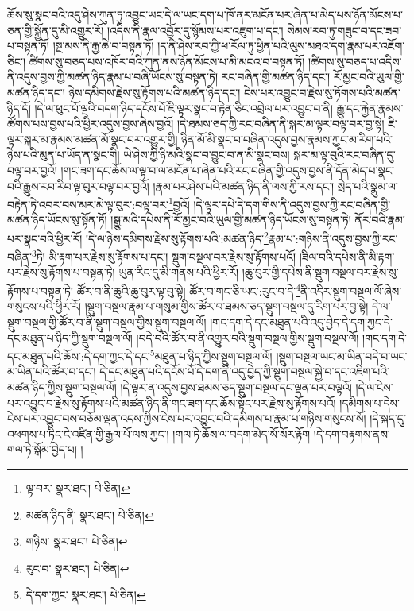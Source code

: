 ཆོས་སུ་སྣང་བའི་འདུ་ཤེས་ཀུན་ཏུ་འབྱུང་ཡང་དེ་ལ་ཡང་དག་པ་ཁོ་ནར་མངོན་པར་ཞེན་པ་མེད་པས་ཉོན་མོངས་པ་ཅན་གྱི་སྐྱོན་དུ་མི་འགྱུར་རོ། །འདིས་ནི་རྣལ་འབྱོར་དུ་སྙོམས་པར་འཇུག་པ་དང་། སེམས་རབ་ཏུ་གཟུང་བ་དང་ཟབ་པ་བསྟན་ཏོ། །སྔ་མས་ནི་རྒྱ་ཆེ་བ་བསྟན་ཏོ། །ད་ནི་ཤེས་རབ་ཀྱི་ཕ་རོལ་ཏུ་ཕྱིན་པའི་ལུས་མཐའ་དག་རྣམ་པར་འཇོག་ཅིང་། ཚིགས་སུ་བཅད་པས་འཁོར་བའི་ཀུན་ནས་ཉོན་མོངས་པ་མི་མངའ་བ་བསྟན་ཏོ། །ཚིགས་སུ་བཅད་པ་འདིས་ནི་འདུས་བྱས་ཀྱི་མཚན་ཉིད་རྣམ་པ་བཞི་ཡོངས་སུ་བསྟན་ཏེ། རང་བཞིན་གྱི་མཚན་ཉིད་དང་། རོ་མྱང་བའི་ཡུལ་གྱི་མཚན་ཉིད་དང་། ཉེས་དམིགས་རྗེས་སུ་རྟོགས་པའི་མཚན་ཉིད་དང་། ངེས་པར་འབྱུང་བ་རྗེས་སུ་ཏོགས་པའི་མཚན་ཉིད་དོ། །དེ་ལ་ཕུང་པོ་ལྔའི་བདག་ཉིད་དངོས་པོ་ཇི་ལྟར་སྣང་བ་རྟེན་ཅིང་འབྲེལ་པར་འབྱུང་བ་ནི། རྒྱུ་དང་རྐྱེན་རྣམས་ཚོགས་པས་བྱས་པའི་ཕྱིར་འདུས་བྱས་ཞེས་བྱའོ། །དེ་ཐམས་ཅད་ཀྱི་རང་བཞིན་ནི་སྐར་མ་ལྟར་བལྟ་བར་བྱ་སྟེ། ཇི་ལྟར་སྐར་མ་རྣམས་མཚན་མོ་སྣང་བར་འགྱུར་གྱི། ཉིན་མོ་མི་སྣང་བ་བཞིན་འདུས་བྱས་རྣམས་ཀྱང་མ་རིག་པའི་ཉེས་པའི་མུན་པ་ཡོད་ན་སྣང་གི། ཡེ་ཤེས་ཀྱི་ཉི་མའི་སྣང་བ་བྱུང་བ་ན་མི་སྣང་བས། སྐར་མ་ལྟ་བུའི་རང་བཞིན་དུ་བལྟ་བར་བྱའོ། །གང་ཟག་དང་ཆོས་ལ་ལྟ་བ་ལ་མངོན་པ་ཞེན་པའི་རང་བཞིན་གྱི་འདུས་བྱས་ནི་དོན་མེད་པ་སྣང་བའི་རྒྱུས་རབ་རིབ་ལྟ་བུར་བལྟ་བར་བྱའོ། །རྣམ་པར་ཤེས་པའི་མཚན་ཉིད་ནི་ལས་ཀྱི་རས་དང་། སྲེད་པའི་སྣུམ་ལ་བརྟེན་ཏེ་འབར་བས་མར་མེ་ལྟ་བུར་:བལྟ་བར་\footnote{ལྟ་བར་  སྣར་ཐང་།  པེ་ཅིན། }བྱའོ། །དེ་ལྟར་དཔེ་དེ་དག་གིས་ནི་འདུས་བྱས་ཀྱི་རང་བཞིན་གྱི་མཚན་ཉིད་ཡོངས་སུ་སྟོན་ཏོ། །སྒྱུ་མའི་དཔེས་ནི་རོ་མྱང་བའི་ཡུལ་གྱི་མཚན་ཉིད་ཡོངས་སུ་བསྟན་ཏེ། ནོར་བའི་རྣམ་པར་སྣང་བའི་ཕྱིར་རོ། །དེ་ལ་ཉེས་དམིགས་རྗེས་སུ་རྟོགས་པའི་:མཚན་ཉིད་\footnote{མཚན་ཉིད་ནི་  སྣར་ཐང་།  པེ་ཅིན། }རྣམ་པ་:གཉིས་ནི་འདུས་བྱས་ཀྱི་རང་བཞིན་\footnote{གཉིས་  སྣར་ཐང་།  པེ་ཅིན། }ཏེ། མི་རྟག་པར་རྗེས་སུ་རྟོགས་པ་དང་། སྡུག་བསྔལ་བར་རྗེས་སུ་རྟོགས་པའོ། །ཟིལ་བའི་དཔེས་ནི་མི་རྟག་པར་རྗེས་སུ་རྟོགས་པ་བསྟན་ཏེ། ཡུན་རིང་དུ་མི་གནས་པའི་ཕྱིར་རོ། །ཆུ་བུར་གྱི་དཔེས་ནི་སྡུག་བསྔལ་བར་རྗེས་སུ་རྟོགས་པ་བསྟན་ཏེ། ཚོར་བ་ནི་ཆུའི་ཆུ་བུར་ལྟ་བུ་སྟེ། ཚོར་བ་གང་ཅི་ཡང་:རུང་བ་དེ་\footnote{རུང་བ་  སྣར་ཐང་།  པེ་ཅིན། }ནི་འདིར་སྡུག་བསྔལ་ལོ་ཞེས་གསུངས་པའི་ཕྱིར་རོ། །སྡུག་བསྔལ་རྣམ་པ་གསུམ་གྱིས་ཚོར་བ་ཐམས་ཅད་སྡུག་བསྔལ་དུ་རིག་པར་བྱ་སྟེ། དེ་ལ་སྡུག་བསྔལ་གྱི་ཚོར་བ་ནི་སྡུག་བསྔལ་གྱིས་སྡུག་བསྔལ་ལོ། །གང་དག་དེ་དང་མཐུན་པའི་འདུ་བྱེད་དེ་དག་ཀྱང་དེ་དང་མཐུན་པ་ཉིད་ཀྱི་སྡུག་བསྔལ་ལོ། །བདེ་བའི་ཚོར་བ་ནི་འགྱུར་བའི་སྡུག་བསྔལ་གྱིས་སྡུག་བསྔལ་ལོ། །གང་དག་དེ་དང་མཐུན་པའི་ཆོས་:དེ་དག་ཀྱང་དེ་དང་\footnote{དེ་དག་ཀྱང་  སྣར་ཐང་།  པེ་ཅིན། }མཐུན་པ་ཉིད་ཀྱིས་སྡུག་བསྔལ་ལོ། །སྡུག་བསྔལ་ཡང་མ་ཡིན་བདེ་བ་ཡང་མ་ཡིན་པའི་ཚོར་བ་དང་། དེ་དང་མཐུན་པའི་དངོས་པོ་དེ་དག་ནི་འདུ་བྱེད་ཀྱི་སྡུག་བསྔལ་སྐྱེ་བ་དང་འཇིག་པའི་མཚན་ཉིད་ཀྱིས་སྡུག་བསྔལ་ལོ། །དེ་ལྟར་ན་འདུས་བྱས་ཐམས་ཅད་སྡུག་བསྔལ་དང་ལྡན་པར་བལྟའོ། །དེ་ལ་ངེས་པར་འབྱུང་བ་རྗེས་སུ་རྟོགས་པའི་མཚན་ཉིད་ནི་གང་ཟག་དང་ཆོས་སྟོང་པར་རྗེས་སུ་རྟོགས་པའོ། །དམིགས་པ་དེས་ངེས་པར་འབྱུང་བས་བཅོམ་ལྡན་འདས་ཀྱིས་ངེས་པར་འབྱུང་བའི་དམིགས་པ་རྣམ་པ་གཉིས་གསུངས་སོ། །དེ་སྐད་དུ་འཕགས་པ་ཏིང་ངེ་འཛིན་གྱི་རྒྱལ་པོ་ལས་ཀྱང་། །གལ་ཏེ་ཆོས་ལ་བདག་མེད་སོ་སོར་རྟོག །དེ་དག་བརྟགས་ནས་གལ་ཏེ་སྒོམ་བྱེད་པ། །
